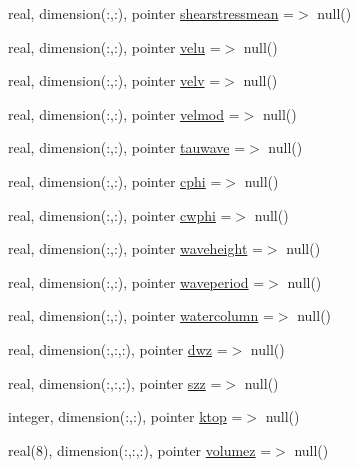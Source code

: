 \begin{DoxyCompactItemize}
\item 
real, dimension(\+:,\+:), pointer \mbox{\hyperlink{structmodulesediment_1_1t__external_a0caa714659d711bc7f869f668c5b9acf}{shearstressmean}} =$>$ null()
\item 
real, dimension(\+:,\+:), pointer \mbox{\hyperlink{structmodulesediment_1_1t__external_a7ebb5f76ae1b4271047c80b59653c56f}{velu}} =$>$ null()
\item 
real, dimension(\+:,\+:), pointer \mbox{\hyperlink{structmodulesediment_1_1t__external_aeecc869bcf737aa3c3e51b51d4520e9f}{velv}} =$>$ null()
\item 
real, dimension(\+:,\+:), pointer \mbox{\hyperlink{structmodulesediment_1_1t__external_a92f2652ffeffa037e6b6d1820a1909e1}{velmod}} =$>$ null()
\item 
real, dimension(\+:,\+:), pointer \mbox{\hyperlink{structmodulesediment_1_1t__external_aec3f1582c4c46ff763b9e629d2418933}{tauwave}} =$>$ null()
\item 
real, dimension(\+:,\+:), pointer \mbox{\hyperlink{structmodulesediment_1_1t__external_a009457ccf420d96d238c42c342ab5dbc}{cphi}} =$>$ null()
\item 
real, dimension(\+:,\+:), pointer \mbox{\hyperlink{structmodulesediment_1_1t__external_a8225d7cd89306e899a70fc055e9a3703}{cwphi}} =$>$ null()
\item 
real, dimension(\+:,\+:), pointer \mbox{\hyperlink{structmodulesediment_1_1t__external_af79c715825ef7afa4a4e1f076f5cd715}{waveheight}} =$>$ null()
\item 
real, dimension(\+:,\+:), pointer \mbox{\hyperlink{structmodulesediment_1_1t__external_a0a0943b3e997d413982b530ad0d940f3}{waveperiod}} =$>$ null()
\item 
real, dimension(\+:,\+:), pointer \mbox{\hyperlink{structmodulesediment_1_1t__external_a880e028e0dde289247ab91619169d5d3}{watercolumn}} =$>$ null()
\item 
real, dimension(\+:,\+:,\+:), pointer \mbox{\hyperlink{structmodulesediment_1_1t__external_a1d177d3df5adaa78df33eb55951950d3}{dwz}} =$>$ null()
\item 
real, dimension(\+:,\+:,\+:), pointer \mbox{\hyperlink{structmodulesediment_1_1t__external_a101583014a027dfa8534c1c320c5855d}{szz}} =$>$ null()
\item 
integer, dimension(\+:,\+:), pointer \mbox{\hyperlink{structmodulesediment_1_1t__external_a3cf49d458a3ddc1dfaa29cfed1fba7e2}{ktop}} =$>$ null()
\item 
real(8), dimension(\+:,\+:,\+:), pointer \mbox{\hyperlink{structmodulesediment_1_1t__external_a1c4e158ebd01f3641c46d4cb18ccb8b0}{volumez}} =$>$ null()
\end{DoxyCompactItemize}


